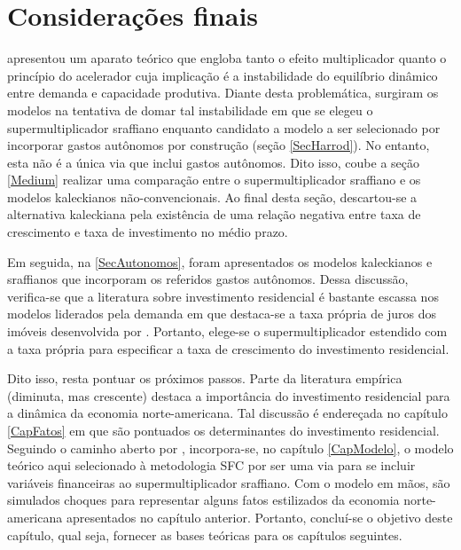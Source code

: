 \section{Considerações finais}
\label{Concl1}




\textcite{harrod_essay_1939} apresentou um aparato teórico que engloba tanto o efeito multiplicador quanto o princípio do acelerador cuja implicação é a instabilidade do equilíbrio dinâmico entre demanda e capacidade produtiva. Diante desta problemática, surgiram os modelos na tentativa de domar tal instabilidade em que se elegeu o supermultiplicador sraffiano enquanto candidato a modelo a ser selecionado por incorporar gastos autônomos por construção (seção \ref{SecHarrod}). 
No entanto, esta não é a única via que inclui gastos autônomos.
Dito isso, coube a seção \ref{Medium} realizar uma comparação entre o supermultiplicador sraffiano e os modelos kaleckianos não-convencionais.
Ao final desta seção, descartou-se a alternativa kaleckiana pela existência de uma relação negativa entre taxa de crescimento e taxa de investimento no médio prazo.


Em seguida, na \ref{SecAutonomos},
foram apresentados os modelos kaleckianos e sraffianos que incorporam os referidos gastos autônomos.
Dessa discussão, verifica-se que a literatura sobre investimento residencial é bastante escassa nos modelos liderados pela demanda em que destaca-se a taxa própria de juros dos imóveis desenvolvida por \textcite{teixeira_crescimento_2015}.
Portanto, elege-se o supermultiplicador estendido com a taxa própria para especificar a taxa de crescimento do investimento residencial.

Dito isso, resta pontuar os próximos passos.
Parte da literatura empírica (diminuta, mas crescente) destaca a importância do investimento residencial para a dinâmica da economia norte-americana. 
Tal discussão é endereçada no capítulo \ref{CapFatos} em que são pontuados os determinantes do investimento residencial.
Seguindo o caminho aberto por \textcite{brochier_supermultiplier_2018}, 
incorpora-se, no capítulo \ref{CapModelo}, o modelo teórico aqui selecionado à metodologia SFC por ser uma via para se incluir variáveis financeiras ao supermultiplicador sraffiano.
Com o modelo em mãos, são simulados choques para representar alguns fatos estilizados da economia norte-americana apresentados no capítulo anterior.
Portanto, concluí-se o objetivo deste capítulo, qual seja, fornecer as bases teóricas para os capítulos seguintes.


